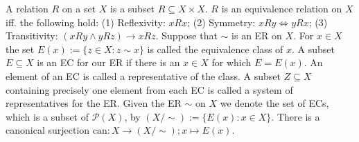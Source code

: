  A relation $R$ on a set $X$ is a subset $R \subseteq X \times X$. $R$ is an equivalence relation on $X$ iff. the following hold:
(1) Reflexivity: $xRx$;
(2) Symmetry: $xRy \Leftrightarrow yRx$;
(3) Transitivity: $(xRy \land yRz) \rightarrow xRz$.
 Suppose that $\sim$ is an ER on $X$. For $x \in X$ the set $E(x) := \{z \in X : z \sim x\}$ is called the equivalence class of $x$. A subset $E \subseteq X$ is an EC for our ER if there is an $x \in X$ for which $E = E(x)$. An element of an EC is called a representative of the class. A subset $Z \subseteq X$ containing precisely one element from each EC is called a system of representatives for the ER.
 Given the ER $\sim$ on $X$ we denote the set of ECs, which is a subset of $\mathcal{P}(X)$, by $(X/\sim) := \{E(x) : x \in X\}$. There is a canonical surjection $\text{can} : X \to (X/\sim); x \mapsto E(x)$.